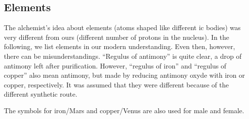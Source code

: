 \documentclass[british,final,landscape]{scrartcl}
\begin{document}
\begin{refsection}
\section{Elements}

The alchemist's idea about elements (atoms shaped like different ic bodies) was very different from ours (different number of protons in the nucleus). In the following, we list elements in our modern understanding. Even then, however, there can be misunderstandings. ``Regulus of antimony'' is quite clear, a drop of antimony left after purification. However, ``regulus of iron'' and ``regulus of copper'' also mean antimony, but made by reducing antimony oxyde with iron or copper, respectively. It was assumed that they were different because of the different synthetic route.

The symbols for iron/Mars and copper/Venus are also used for male and female.


\end{refsection}
\end{document}
